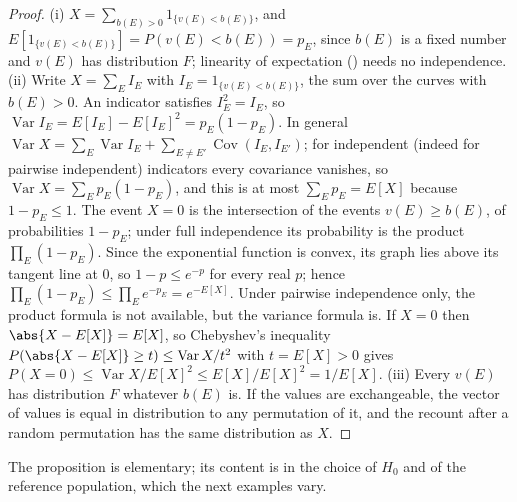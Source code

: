 \begin{sloppypar}
\begin{proof}
(i) $X=\sum_{b(E)>0}1_{\{v(E)<b(E)\}}$, and $E[1_{\{v(E)<b(E)\}}]=P(v(E)<b(E))=p_E$, since $b(E)$ is a fixed number and $v(E)$ has distribution $F$; linearity of expectation
() needs no independence. (ii) Write $X=\sum_EI_E$ with $I_E=1_{\{v(E)<b(E)\}}$, the sum over the curves with $b(E)>0$. An indicator satisfies
$I_E^2=I_E$, so $\operatorname{Var}I_E=E[I_E]-E[I_E]^2=p_E(1-p_E)$. In general $\operatorname{Var}X=\sum_E\operatorname{Var}I_E+\sum_{E\ne E'}\operatorname{Cov}(I_E,I_{E'})$; for
independent (indeed for pairwise independent) indicators every covariance vanishes, so $\operatorname{Var}X=\sum_Ep_E(1-p_E)$, and this is at most
$\sum_Ep_E=E[X]$ because $1-p_E\le1$. The event $X=0$ is the intersection of the events $v(E)\ge b(E)$, of probabilities $1-p_E$; under full independence its
probability is the product $\prod_E(1-p_E)$. Since the exponential function is convex, its graph lies above its tangent line at $0$, so $1-p\le e^{-p}$
for every real $p$; hence $\prod_E(1-p_E)\le\prod_Ee^{-p_E}=e^{-E[X]}$. Under pairwise independence only, the product formula is not available, but the
variance formula is. If $X=0$ then $\abs{X-E[X]}=E[X]$, so Chebyshev's inequality $P(\abs{X-E[X]}\ge t)\le\operatorname{Var}X/t^2$ with $t=E[X]>0$ gives
$P(X=0)\le\operatorname{Var}X/E[X]^2\le E[X]/E[X]^2=1/E[X]$. (iii) Every $v(E)$ has distribution $F$ whatever $b(E)$ is. If the values are exchangeable, the vector of
values is equal in distribution to any permutation of it, and the recount after a random permutation has the same distribution as $X$.
\end{proof}

The proposition is elementary; its content is in the choice of $H_0$ and of the reference population, which the next examples vary.


\end{sloppypar}

